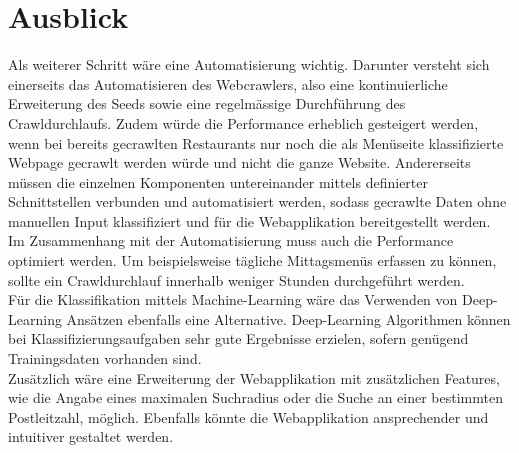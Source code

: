 \section{Ausblick}
Als weiterer Schritt wäre eine Automatisierung wichtig.
Darunter versteht sich einerseits das Automatisieren des Webcrawlers, also eine kontinuierliche Erweiterung des Seeds sowie eine regelmässige Durchführung des Crawldurchlaufs.
Zudem würde die Performance erheblich gesteigert werden, wenn bei bereits gecrawlten Restaurants nur noch die als Menüseite klassifizierte Webpage gecrawlt werden würde und nicht die ganze Website.
Andererseits müssen die einzelnen Komponenten untereinander mittels definierter Schnittstellen verbunden und automatisiert werden, sodass gecrawlte Daten ohne manuellen Input klassifiziert und für die Webapplikation bereitgestellt werden.\\
Im Zusammenhang mit der Automatisierung muss auch die Performance optimiert werden.
Um beispielsweise tägliche Mittagsmenüs erfassen zu können, sollte ein Crawldurchlauf innerhalb weniger Stunden durchgeführt werden.\\
Für die Klassifikation mittels Machine-Learning wäre das Verwenden von Deep-Learning Ansätzen ebenfalls eine Alternative.
Deep-Learning Algorithmen können bei Klassifizierungsaufgaben sehr gute Ergebnisse erzielen, sofern genügend Trainingsdaten vorhanden sind.\\
Zusätzlich wäre eine Erweiterung der Webapplikation mit zusätzlichen Features, wie die Angabe eines maximalen Suchradius oder die Suche an einer bestimmten Postleitzahl, möglich.
Ebenfalls könnte die Webapplikation ansprechender und intuitiver gestaltet werden.


